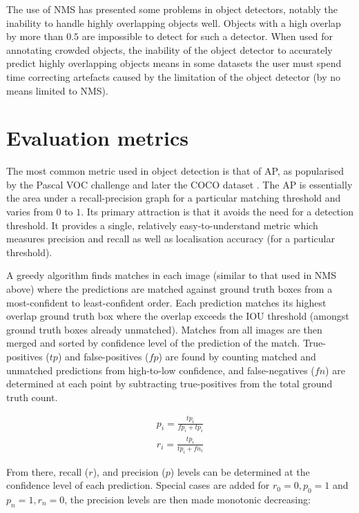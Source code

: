 The use of \gls{NMS} has presented some problems in object detectors, notably the inability to handle highly overlapping objects well. Objects with a high overlap by more than $0.5$ are impossible to detect for such a detector. When used for annotating crowded objects, the inability of the object detector to accurately predict highly overlapping objects means in some datasets the user must spend time correcting artefacts caused by the limitation of the object detector (by no means limited to \gls{NMS}).


\section{Evaluation metrics}
\label{sec:evaluation_metrics}

The most common metric used in object detection is that of \gls{AP}, as popularised by the Pascal VOC challenge \cite{Everingham2008} and later the COCO dataset \cite{Lin2014}. The \gls{AP} is essentially the area under a recall-precision graph for a particular matching threshold and varies from $0$  to $1$. Its primary attraction is that it avoids the need for a detection threshold. It provides a single, relatively easy-to-understand metric which measures precision and recall as well as localisation accuracy (for a particular threshold).

A greedy algorithm finds matches in each image (similar to that used in \gls{NMS} above) where the predictions are matched against ground truth boxes from a most-confident to least-confident order. Each prediction matches its highest overlap ground truth box where the overlap exceeds the \gls{IOU} threshold (amongst ground truth boxes already unmatched). Matches from all images are then merged and sorted by confidence level of the prediction of the match. True-positives ($tp$) and false-positives ($fp$) are found by counting matched and unmatched predictions from high-to-low confidence, and false-negatives ($fn$) are determined at each point by subtracting true-positives from the total ground truth count. 

\begin{equation*}
\begin{split}
p_i = \frac{tp_i}{fp_i + tp_i}\\
r_i = \frac{tp_i}{tp_i + fn_i}
\end{split}
\label{eq:recall_precision}
\end{equation*}

From there, recall ($r$), and precision ($p$) levels can be determined at the confidence level of each prediction. Special cases are added for $r_0=0, p_0=1$ and $p_n=1, r_n=0$, the precision levels are then made monotonic decreasing:

